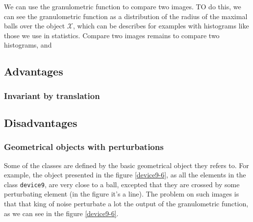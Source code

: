 We can use the granulometric function to compare two images. TO do this, we can see the granulometric function as a distribution of the radius of the maximal balls over the object $\mathcal{X}$, which can be describes for examples with histograms like those we use in statistics. Compare two images remains to compare two histograms, and 

\subsection{Advantages}

\subsubsection{Invariant by translation}



\subsection{Disadvantages}

\subsubsection{Geometrical objects with perturbations}

Some of the classes are defined by the basic geometrical object they refers to. For example, the object presented in the figure \ref{device9-6}, as all the elements in the class \texttt{device9}, are very close to a ball, excepted that they are crossed by some perturbating element (in the figure it's a line). The problem on such images is that that king of noise perturbate a lot the output of the granulometric function, as we can see in the figure \ref{device9-6}.

